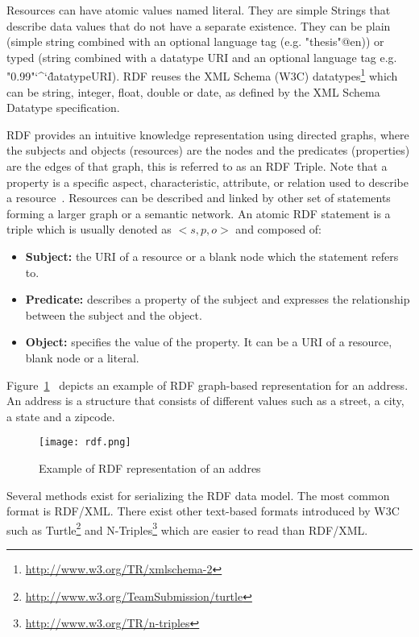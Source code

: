 Resources can have atomic values named literal. They are simple Strings that describe data values that do not have a separate existence. They can be plain (simple string combined with an optional language tag (e.g. "thesis"@en)) or typed (string combined with a datatype URI and an optional language tag e.g. "0.99"\char`\^\char`\^datatypeURI). RDF reuses the  XML Schema (W3C) datatypes\footnote{\url{http://www.w3.org/TR/xmlschema-2}} which can be string, integer, float, double or date, as defined by the XML Schema Datatype specification.

RDF provides an intuitive knowledge representation using directed graphs, where the subjects and objects (resources) are the nodes and the predicates (properties) are the edges of that graph, this is referred to as an RDF Triple. Note that a property is a specific aspect, characteristic, attribute, or relation used to describe a resource~\cite{Lassila:RDF:1999}. Resources can be described and linked by other set of statements forming a larger graph or a semantic network. An atomic RDF statement is a triple which is usually denoted as $<s,p,o>$ and composed of:

\begin{itemize}
\item \textbf{Subject:} the URI of a resource or a blank node which the statement refers to.
\item \textbf{Predicate:} describes a property of the subject and expresses the relationship between the subject and the object.
\item \textbf{Object:} specifies the value of the property. It can be a URI of a resource, blank node or a literal.
\end{itemize}

Figure~\ref{fig:rdfGraph}~ depicts an example of RDF graph-based representation for an address. An address is a structure that consists of different values such as a street, a city, a state and a zipcode.

 \begin{figure}[htbp]
   \centering
  \texttt{[image: rdf.png]}
  \caption{Example of RDF representation of an addres}
  \label{fig:rdfGraph}
  \end{figure}

Several methods exist for serializing the RDF data model. The most common format is RDF/XML. There exist other text-based formats introduced by W3C such as Turtle\footnote{\url{http://www.w3.org/TeamSubmission/turtle}} and N-Triples\footnote{\url{http://www.w3.org/TR/n-triples}} which are easier to read than RDF/XML.

